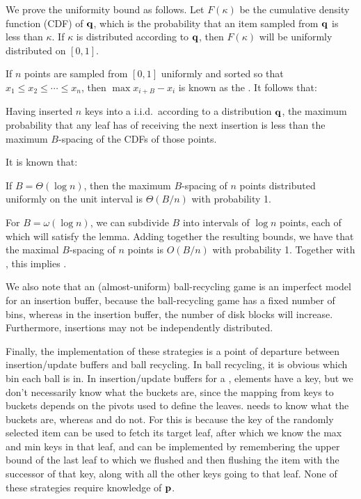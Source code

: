 We prove the uniformity bound as follows.  Let $F(\kappa)$ be the cumulative
density function (CDF) of $\mathbf{q}$, which is the probability that an item sampled
from $\mathbf{q}$ is less than $\kappa$.  If $\kappa$ is distributed according to $\mathbf{q}$,
then $F(\kappa)$ will be uniformly distributed on $[0,1]$.

If $n$ points are sampled from $[0,1]$ uniformly and sorted so that $x_1
\leq x_2 \leq \cdots \leq x_n$, then $\max{x_{i+B}-x_i}$ is known as the
. It follows that:

\begin{lemma}\label{lem:leaf-b-spacing}
	Having inserted $n$ keys into a \btree{} i.i.d.\ according to a distribution
	$\mathbf{q}$, the maximum probability that any leaf has of receiving the next
	insertion is less than the maximum $B$-spacing of the CDFs of those points.
\end{lemma}

It is known that:

\begin{lemma}
	If $B = \Theta(\log{n})$, then the maximum $B$-spacing of $n$ points
	distributed uniformly on the unit interval is $\Theta(B/n)$ with
	probability 1.
\end{lemma}

For $B = \omega(\log{n})$, we can subdivide $B$ into intervals of $\log{n}$
points, each of which will satisfy the lemma. Adding together the resulting
bounds, we have that the maximal $B$-spacing of $n$ points is $O(B/n)$ with
probability 1. Together with , this implies
.

We also note that an (almost-uniform) ball-recycling game is an imperfect model
for an insertion buffer, because the ball-recycling game has a fixed number of
bins, whereas in the insertion buffer, the number of disk blocks will increase.
Furthermore, insertions may not be independently distributed.

Finally, the implementation of these strategies is a point of departure between
insertion/update buffers and ball recycling.  In ball recycling, it is obvious
which bin each ball is in.  In insertion/update buffers for a \btree{},
elements have a key, but we don't necessarily know what the buckets are, since
the mapping from keys to buckets depends on the pivots used to define the
\btree{} leaves.  \FB needs to know what the buckets are, whereas \RB and \GG
do not.  For \RB this is because the key of the randomly selected item can be
used to fetch its target \btree{} leaf, after which we know the max and min
keys in that leaf, and \GG can be implemented by remembering the upper bound of
the last leaf to which we flushed and then flushing the item with the successor
of that key, along with all the other keys going to that leaf.  None of these
strategies require knowledge of $\mathbf{p}$. 

